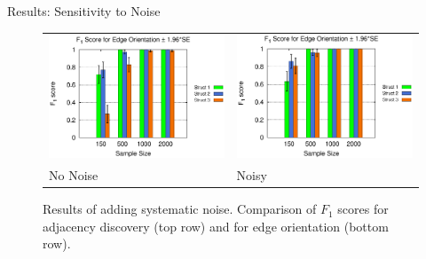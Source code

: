 \documentclass[hyperref={pdfpagelabels=false}]{beamer}
\begin{document}
\begin{frame}{Results: Sensitivity to Noise}
\begin{figure}[!ht]
\begin{center}
\begin{tabular}{>{\centering}m{1.5in} >{\centering\arraybackslash}m{1.5in}}
						\includegraphics[width=1.1\linewidth]{figures/F1O_single.eps} &\includegraphics[width=1.1\linewidth]{figures/F1O_single_noisy.eps}\\
						No Noise & Noisy
					\end{tabular}
				\end{center}
				\caption{\footnotesize Results of adding systematic noise. Comparison of $F_1$ scores for adjacency discovery (top row) and for edge orientation (bottom row).}
				\label{fig:f1-noisy} 
			\end{figure}
\end{frame}
\end{document}

